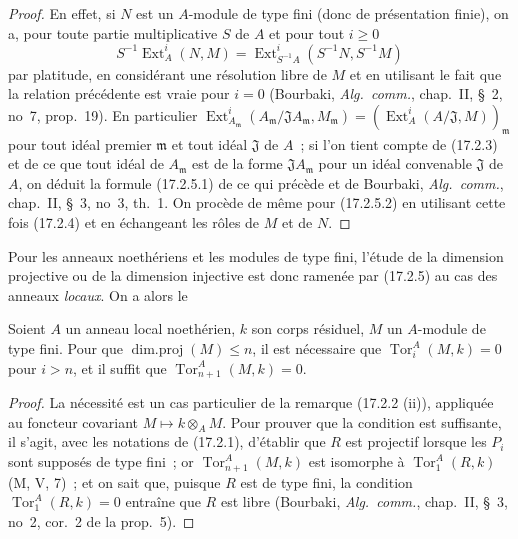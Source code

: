 \begin{proof}
En effet, si $N$ est un $A$-module de type fini (donc de présentation finie),
on a, pour toute partie multiplicative $S$ de $A$ et pour tout $i\geq0$
\[
  S^{-1}\operatorname{Ext}^i_A(N,M)
  =\operatorname{Ext}^i_{S^{-1}A}(S^{-1}N,S^{-1}M)
\]
par platitude, en considérant une résolution libre de $M$ et en utilisant le
fait que la relation précédente est vraie pour $i=0$ (Bourbaki,
\emph{Alg.~comm.}, chap.~II, \S~2, no~7, prop.~19). En particulier
$\operatorname{Ext}^i_{A_{\mathfrak{m}}}
(A_{\mathfrak{m}}/\mathfrak{J}A_{\mathfrak{m}},M_{\mathfrak{m}})
=(\operatorname{Ext}^i_A(A/\mathfrak{J},M))_{\mathfrak{m}}$ pour tout idéal
premier $\mathfrak{m}$ et tout idéal $\mathfrak{J}$ de $A$~; si l'on tient
compte de (17.2.3) et de ce que tout
idéal de $A_{\mathfrak{m}}$ est de la forme $\mathfrak{J}A_{\mathfrak{m}}$
pour un idéal convenable $\mathfrak{J}$ de $A$, on déduit la formule
(17.2.5.1) de ce qui précède et de Bourbaki, \emph{Alg.~comm.}, chap.~II,
\S~3, no~3, th.~1. On procède de même pour (17.2.5.2) en utilisant cette fois
(17.2.4) et en échangeant les rôles de $M$ et de $N$.
\end{proof}

Pour les anneaux noethériens et les modules de type fini, l'étude de la
dimension projective ou de la dimension injective est donc ramenée par
(17.2.5) au cas des anneaux \emph{locaux}. On a alors le

\begin{lemma}[17.2.6]
\label{0.17.2.6-fr}
Soient $A$ un anneau local noethérien, $k$ son corps résiduel, $M$ un
$A$-module de type fini. Pour que $\operatorname{dim.proj}(M)\leq n$, il est
nécessaire que $\operatorname{Tor}^A_i(M,k)=0$ pour $i>n$, et il suffit que
$\operatorname{Tor}^A_{n+1}(M,k)=0$.
\end{lemma}

\begin{proof}
La nécessité est un cas particulier de la remarque (17.2.2 (ii)), appliquée au
foncteur covariant $M\mapsto k\otimes_A M$. Pour prouver que la condition est
suffisante, il s'agit, avec les notations de (17.2.1), d'établir que $R$ est
projectif lorsque les $P_i$ sont supposés de type fini~; or
$\operatorname{Tor}^A_{n+1}(M,k)$ est isomorphe à
$\operatorname{Tor}^A_1(R,k)$ (M, V, 7)~; et on sait que, puisque $R$ est de
type fini, la condition $\operatorname{Tor}^A_1(R,k)=0$ entraîne que $R$ est
libre (Bourbaki, \emph{Alg.~comm.}, chap.~II, \S~3, no~2, cor.~2 de la
prop.~5).
\end{proof}

